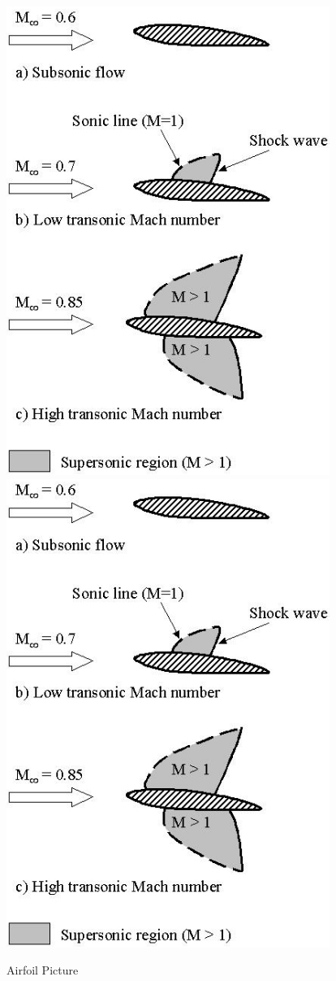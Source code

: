 \begin{figure}[!htbp]
  \begin{center}
	\leavevmode
    \ifpdf
      \includegraphics[height=6in]{aflow}
    \else
      \includegraphics[bb = 92 86 545 742, height=6in]{aflow}
    \fi
    \caption{Airfoil Picture}
    \label{FigAir}
  \end{center}
\end{figure}

